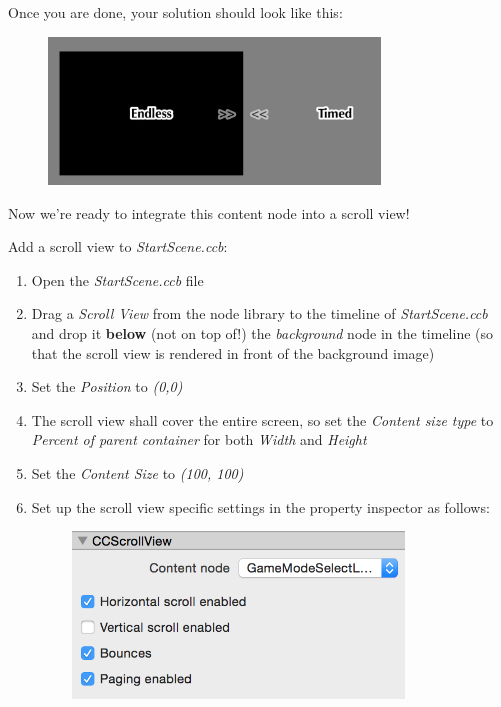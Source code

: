 Once you are done, your solution should look like this:

\begin{figure}[H]
\centering
\includegraphics[width=250pt]{images/Chapter7/sv_result.png}
\end{figure}

Now we're ready to integrate this content node into a scroll view!

\begin{leftbar}
Add a scroll view to \textit{StartScene.ccb}:
\begin{enumerate}
  \item Open the \textit{StartScene.ccb} file
  \item Drag a \textit{Scroll View} from
the node library to the timeline of \textit{StartScene.ccb} and
drop it \textbf{below} (not on top of!) the \textit{background} node in the
timeline (so that the scroll view is rendered in front of the background image)
  
  \item Set the \textit{Position} to \textit{(0,0)}
  \item The scroll view shall cover the entire screen, so set the \textit{Content size
type} to \textit{Percent of parent container} for both \textit{Width} and
\textit{Height}
\item Set the \textit{Content Size} to \textit{(100, 100)}
\item Set up the scroll view specific settings in the
property inspector as follows:
\begin{figure}[H]
\centering
\includegraphics[width=250pt]{images/Chapter7/scrollview_settings.png}
\end{figure}
\end{enumerate}
\end{leftbar}

